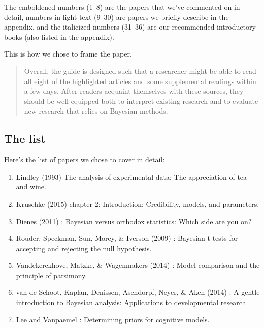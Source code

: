 {The emboldened numbers (1–8) are the papers that we've commented on in detail, numbers in light text (9–30) are papers we briefly describe in the appendix, and the italicized numbers (31–36) are our recommended introductory books (also listed in the appendix).

This is how we chose to frame the paper,

\begin{quote}
    Overall, the guide is designed such that a researcher might be able to read all eight of the highlighted articles and some supplemental readings within a few days. After readers acquaint themselves with these sources, they should be well-equipped both to interpret existing research and to evaluate new research that relies on Bayesian methods.
\end{quote}

\subsection{The list}

Here's the list of papers we chose to cover in detail:

\begin{enumerate}
\item Lindley (1993) \cite{Lindley1993} The analysis of experimental data: The appreciation of tea and wine.

\item Kruschke (2015) \cite{Kruschke2015} chapter 2: Introduction: Credibility, models, and parameters.

\item Dienes (2011) \cite{Dienes2011}: Bayesian versus orthodox statistics: Which side are you on?

\item Rouder, Speckman, Sun, Morey, \& Iverson (2009) \cite{Rouder2009}: Bayesian t tests for accepting and rejecting the null hypothesis.

\item Vandekerckhove, Matzke, \& Wagenmakers (2014) \cite[Chapter 14]{Busemeyer2015}: Model comparison and the principle of parsimony. 

\item van de Schoot, Kaplan, Denissen, Asendorpf, Neyer, \& Aken (2014) \cite{vandeSchoot2013,ZondervanZwijnenburg2017}: A gentle introduction to Bayesian analysis: Applications to developmental research.
    
    
    
\item Lee and Vanpaemel \cite{LeeVanpaemel2017}: Determining priors for cognitive models.


\end{enumerate}}
